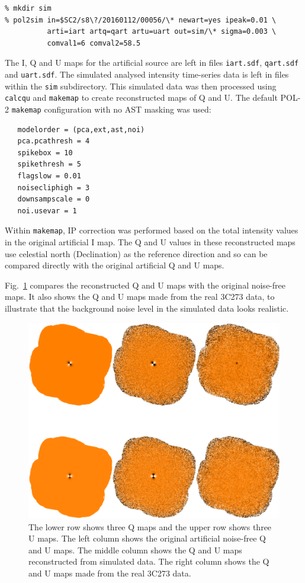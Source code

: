 \documentclass[twoside,11pt]{starlink}
\begin{document}
\begin{verbatim}
% mkdir sim
% pol2sim in=$SC2/s8\?/20160112/00056/\* newart=yes ipeak=0.01 \
          arti=iart artq=qart artu=uart out=sim/\* sigma=0.003 \
          comval1=6 comval2=58.5
\end{verbatim}

The I, Q and U maps for the artificial source are left in files
\texttt{iart.sdf}, \texttt{qart.sdf} and \texttt{uart.sdf}. The simulated
analysed intensity time-series data is left in files within the
\texttt{sim} subdirectory. This simulated data was then processed using
\texttt{calcqu} and \texttt{makemap} to create reconstructed maps of Q
and U. The default POL-2 \texttt{makemap} configuration with no AST
masking was used:

\begin{verbatim}
   modelorder = (pca,ext,ast,noi)
   pca.pcathresh = 4
   spikebox = 10
   spikethresh = 5
   flagslow = 0.01
   noisecliphigh = 3
   downsampscale = 0
   noi.usevar = 1
\end{verbatim}

Within \texttt{makemap}, IP correction was performed based on the total
intensity values in the original artificial I map. The Q and U values in
these reconstructed maps use celestial north (Declination) as the
reference direction and so can be compared directly with the original
artificial Q and U maps.

Fig.~\ref{fig:recon1} compares the reconstructed Q and U maps with the
original noise-free maps. It also shows the Q and U maps made from the
real 3C273 data, to illustrate that the background noise level in the
simulated data looks realistic.

\begin{figure}
\includegraphics[width=\columnwidth]{recon1}
\caption{The lower row shows three Q maps and the upper row shows three U
maps. The left column shows the original artificial noise-free Q and U
maps. The middle column shows the Q and U maps reconstructed from
simulated data. The right column shows the Q and U maps made from the real
3C273 data.}
\label{fig:recon1}
\end{figure}
\end{document}
